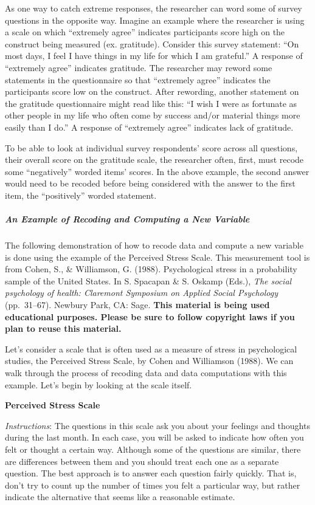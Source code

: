\documentclass[
]{book}
\begin{document}
As one way to catch extreme responses, the researcher can word some of survey questions in the opposite way. Imagine an example where the researcher is using a scale on which ``extremely agree'' indicates participants score high on the construct being measured (ex. gratitude). Consider this survey statement: ``On most days, I feel I have things in my life for which I am grateful.'' A response of ``extremely agree'' indicates gratitude. The researcher may reword some statements in the questionnaire so that ``extremely agree'' indicates the participants score low on the construct. After rewording, another statement on the gratitude questionnaire might read like this: ``I wish I were as fortunate as other people in my life who often come by success and/or material things more easily than I do.'' A response of ``extremely agree'' indicates lack of gratitude.

To be able to look at individual survey respondents' score across all questions, their overall score on the gratitude scale, the researcher often, first, must recode some ``negatively'' worded items' scores. In the above example, the second answer would need to be recoded before being considered with the answer to the first item, the ``positively'' worded statement.

\hypertarget{an-example-of-recoding-and-computing-a-new-variable}{%
\subparagraph{An Example of Recoding and Computing a New Variable}\label{an-example-of-recoding-and-computing-a-new-variable}}

The following demonstration of how to recode data and compute a new variable is done using the example of the Perceived Stress Scale. This measurement tool is from Cohen, S., \& Williamson, G. (1988). Psychological stress in a probability sample of the United States. In S. Spacapan \& S. Oskamp (Eds.), \emph{The social psychology of health: Claremont Symposium on Applied Social Psychology} (pp.~31--67). Newbury Park, CA: Sage. \textbf{This material is being used educational purposes. Please be sure to follow copyright laws if you plan to reuse this material.}

Let's consider a scale that is often used as a measure of stress in psychological studies, the Perceived Stress Scale, by Cohen and Williamson (1988). We can walk through the process of recoding data and data computations with this example. Let's begin by looking at the scale itself.

\textbf{Perceived Stress Scale}

\emph{Instructions}: The questions in this scale ask you about your feelings and thoughts during the last month. In each case, you will be asked to indicate how often you felt or thought a certain way. Although some of the questions are similar, there are differences between them and you should treat each one as a separate question. The best approach is to answer each question fairly quickly. That is, don't try to count up the number of times you felt a particular way, but rather indicate the alternative that seems like a reasonable estimate.
\end{document}
